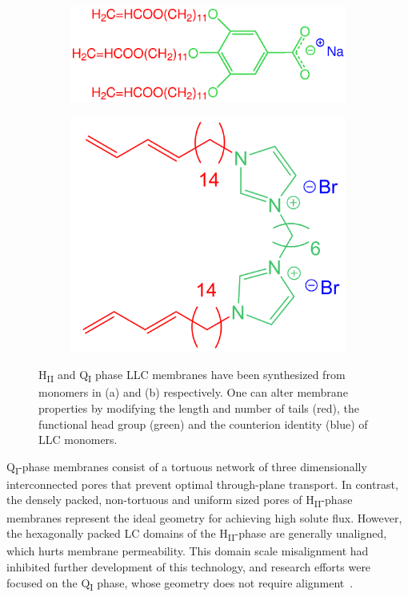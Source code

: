 \documentclass{article}
\begin{document}
  \begin{figure}
  \centering
  \begin{subfigure}{0.55\linewidth}
  \hspace{0.5cm}
  \includegraphics[width=0.8\linewidth]{NaGA3C11_colorcoded.eps}
  \vspace{1.4cm}
  \caption{}\label{fig:HII_mon}
  \end{subfigure}
  \begin{subfigure}{0.4\linewidth}
  \hspace{0.4cm}
  \includegraphics[width=0.7\linewidth]{q1_monomer.png}
  \caption{}\label{fig:q1_mon}
  \end{subfigure}
  \caption{H\textsubscript{II} and Q\textsubscript{I} phase LLC membranes have 
  been synthesized from monomers in (a) and (b) respectively. One can 
  alter membrane properties by modifying the length and number of tails (red), the
  functional head group (green) and the counterion identity (blue) of LLC monomers.}\label{fig:structures}
  \end{figure}

  Q\textsubscript{I}-phase membranes consist of a tortuous network of three
  dimensionally interconnected pores that prevent optimal through-plane
  transport. In contrast, the densely packed, non-tortuous and uniform sized
  pores of H\textsubscript{II}-phase membranes represent the ideal geometry
  for achieving high solute flux\cite{matyka_tortuosity-porosity_2008}. However,
  the hexagonally packed LC domains of the H\textsubscript{II}-phase are generally
  unaligned, which hurts membrane permeability. This domain scale misalignment
  had inhibited further development of this technology, and research efforts were
  focused on the Q\textsubscript{I} phase, whose geometry does not require 
  alignment~\cite{zhou_new_2007}.
\end{document}
